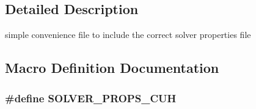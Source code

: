 \subsection{Detailed Description}
simple convenience file to include the correct solver properties file 



\subsection{Macro Definition Documentation}
\subsubsection[{\texorpdfstring{S\+O\+L\+V\+E\+R\+\_\+\+P\+R\+O\+P\+S\+\_\+\+C\+UH}{SOLVER_PROPS_CUH}}]{\setlength{\rightskip}{0pt plus 5cm}\#define S\+O\+L\+V\+E\+R\+\_\+\+P\+R\+O\+P\+S\+\_\+\+C\+UH}\hypertarget{solver__props_8cuh_abab1859a388294ac0be0474379ddc940}{}\label{solver__props_8cuh_abab1859a388294ac0be0474379ddc940}
